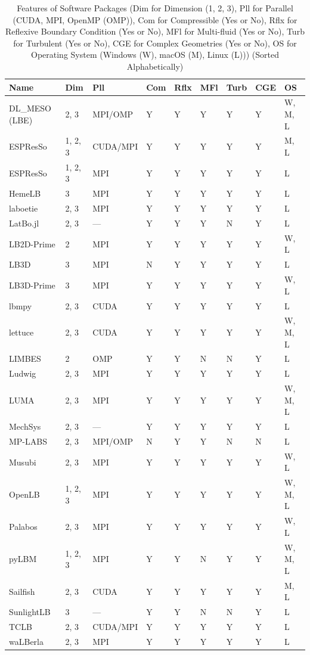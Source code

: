 \documentclass[final, 3p, times, authoryear]{elsarticle}
\newcommand{\esp}{ESPResSo\nolinebreak\hspace{-.05em}\raisebox{.4ex}{\small\bf
+}\nolinebreak\hspace{-.10em}\raisebox{.4ex}{\small\bf +}}
\begin{document}
\begin{table}[ht!]
	\begin{center}
		\begin{tabular}{ p{3cm}llllllll}
			\toprule
			Name & Dim & Pll & Com & Rflx & MFl & Turb & CGE & OS\\
			\midrule
			DL\_MESO (LBE) & 2, 3 & MPI/OMP & Y & Y & Y & Y & Y & W, M, L\\
			ESPResSo & 1, 2, 3 & CUDA/MPI & Y & Y & Y & Y & Y & M, L\\
			\esp{} & 1, 2, 3 & MPI & Y & Y & Y & Y & Y & L\\
			HemeLB & 3 & MPI & Y & Y & Y & Y & Y & L\\
			laboetie & 2, 3 & MPI & Y & Y & Y & Y & Y & L\\
			LatBo.jl & 2, 3 & — & Y & Y & Y & N & Y & L\\
			LB2D-Prime & 2 & MPI & Y & Y & Y & Y & Y & W, L\\
			LB3D & 3 & MPI & N & Y & Y & Y & Y & L\\
			LB3D-Prime & 3 & MPI & Y & Y & Y & Y & Y & W, L\\
			lbmpy & 2, 3 & CUDA & Y & Y & Y & Y & Y & L\\
			lettuce & 2, 3 & CUDA & Y & Y & Y & Y & Y & W, M, L\\
			LIMBES & 2 & OMP & Y & Y & N & N & Y & L\\
			Ludwig & 2, 3 & MPI & Y & Y & Y & Y & Y & L\\
			LUMA & 2, 3 & MPI & Y & Y & Y & Y & Y & W, M, L\\
			MechSys & 2, 3 & — & Y & Y & Y & Y & Y & L\\
			MP-LABS & 2, 3 & MPI/OMP & N & Y & Y & N & N & L\\
			Musubi & 2, 3 & MPI & Y & Y & Y & Y & Y & W, L\\
			OpenLB & 1, 2, 3 & MPI & Y & Y & Y & Y & Y & W, M, L\\
			Palabos & 2, 3 & MPI & Y & Y & Y & Y & Y & W, L\\
			pyLBM & 1, 2, 3 & MPI & Y & Y & N & Y & Y & W, M, L\\
			Sailfish & 2, 3 & CUDA & Y & Y & Y & Y & Y & M, L\\
			SunlightLB & 3 & — & Y & Y & N & N & Y & L\\
			TCLB & 2, 3 & CUDA/MPI & Y & Y & Y & Y & Y & L\\
			waLBerla & 2, 3 & MPI & Y & Y & Y & Y & Y & L\\
			\bottomrule
		\end{tabular}
		\caption{Features of Software Packages (Dim for Dimension (1, 2, 3), Pll
			for Parallel (CUDA, MPI, OpenMP (OMP)), Com for Compressible (Yes or
			No), Rflx for Reflexive Boundary Condition (Yes or No), MFl for
			Multi-fluid (Yes or No), Turb for Turbulent (Yes or No), CGE for
			Complex Geometries (Yes or No), OS for Operating System (Windows
			(W), macOS (M), Linux (L))) (Sorted Alphabetically)} \label{tbl_features}
	\end{center}
\end{table}
\end{document}
